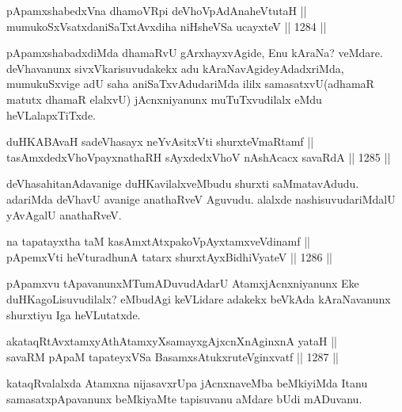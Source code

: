 \begin{shl}
pApamxshabedxVna dhamoVR\s pi deVhoVpAdAnaheVtutaH || \\
mumukoSxVsatxdaniSaTxtAvxdiha niHsheVSa ucayxteV \hfill || 1284 ||  
\end{shl}

\begin{artha}
pApamxshabadxdiMda dhamaRvU gArxhayxvAgide, Enu kAraNa? veMdare. deVhavanunx sivxVkarisuvudakekx adu kAraNavAgideyAdadxriMda, mumukuSxvige adU saha aniSaTxvAdudariMda ililx samasatxvU(adhamaR matutx dhamaR elalxvU) jAcnxniyanunx muTuTxvudilalx eMdu heVLalapxTiTxde.
\end{artha}


\begin{shl}
duHKABAvaH sadeVhasayx neYvAsitxVti shurxteVmaRtamf || \\
tasAmxdedxVhoV\s payxnathaRH sAyxdedxVhoV nAshAcacx savaRdA \hfill || 1285 ||  
\end{shl}

\begin{artha}
deVhasahitanAdavanige duHKavilalxveMbudu shurxti saMmatavAdudu. adariMda deVhavU avanige anathaRveV Aguvudu. alalxde nashisuvudariMdalU yAvAgalU anathaRveV.
\end{artha}


\begin{shl}
na tapatayxtha taM kasAmxtAtxpakoV\s pAyxtamxveVdinamf ||  \\
pApemxVti heVturadhunA tatarx shurxtAyx\s BidhiVyateV \hfill || 1286 ||  
\end{shl}

\begin{artha}
pApamxvu tApavanunxMTumADuvudAdarU AtamxjAcnxniyanunx Eke duHKagoLisuvudilalx? eMbudAgi keVLidare adakekx beVkAda kAraNavanunx shurxtiyu Iga heVLutatxde.
\end{artha}

\begin{shl}
akataqRtAvxtamxyAthAtamxyXsamayxgAjxcnXnAginxnA yataH || \\
savaRM pApaM tapateyxVSa BasamxsAtukxruteV\s ginxvatf \hfill || 1287 ||  
\end{shl}

\begin{artha}
kataqRvalalxda Atamxna nijasavxrUpa jAcnxnaveMba beMkiyiMda Itanu samasatxpApavanunx beMkiyaMte tapisuvanu aMdare bUdi mADuvanu.
\end{artha}

